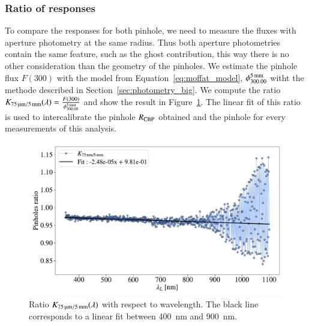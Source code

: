 \subsubsection{Ratio of \SD responses}

To compare the \SD responses for both pinhole, we need to measure the fluxes with aperture photometry at the same radius. Thus both aperture photometries contain the same feature, such as the ghost contribution, this way there is no other consideration than the geometry of the pinholes. We estimate the \spinhole pinhole flux $F(300)$ with the model from Equation~\ref{eq:moffat_model}, $\phi^{\SI{5}{\milli\meter}}_{300.00}$ witht the methode described in Section~\ref{sec:photometry_big}. We compute the ratio $K_\mathrm{\SI{75}{\micro\meter}/\SI{5}{\milli\meter}}(\lambda)=\frac{F(300)}{\phi^{\SI{5}{\milli\meter}}_{300.00}}$ and show the result in Figure~\ref{fig:ratio_pinholes}. The linear fit of this ratio is used to intercalibrate the \bpinhole pinhole $R_{\mathrm{CBP}}$ obtained and the \spinhole pinhole \SD for every measurements of this analysis.



\begin{figure}[h]
    \centering
    \includegraphics[width=\columnwidth]{fig/ratio_pinholes.pdf}
    \caption{Ratio $K_\mathrm{\SI{75}{\micro\meter}/\SI{5}{\milli\meter}}(\lambda)$ with respect to wavelength. The black line corresponds to a linear fit between \SI{400}{\nm} and \SI{900}{\nm}.}
    \label{fig:ratio_pinholes}
\end{figure}

